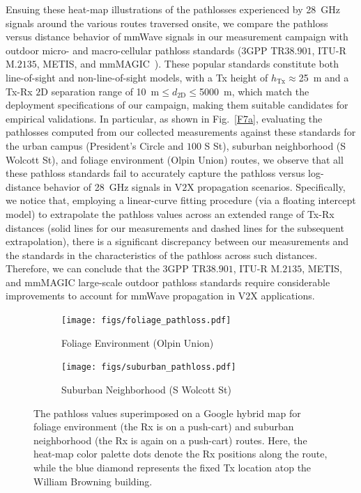 \documentclass[12pt, draftcls, onecolumn]{IEEEtran}
\begin{document}
{Ensuing these heat-map illustrations of the pathlosses experienced by \SI{28}{\giga\hertz} signals around the various routes traversed onsite, we compare the pathloss versus distance behavior of mmWave signals in our measurement campaign with outdoor micro- and macro-cellular pathloss standards ($3$GPP TR$38.901$, ITU-R M$.2135$, METIS, and mmMAGIC~\cite{MacCartneyModelsOverview}). These popular standards constitute both line-of-sight and non-line-of-sight models, with a Tx height of $h_{\text{Tx}}{\approx}$\SI{25}{\meter} and a Tx-Rx $2$D separation range of \SI{10}{\meter}${\leq}d_{2\text{D}}{\leq}$\SI{5000}{\meter}, which match the deployment specifications of our campaign, making them suitable candidates for empirical validations. In particular, as shown in Fig.~\ref{F7a}, evaluating the pathlosses computed from our collected measurements against these standards for the urban campus (President's Circle and $100$ S St), suburban neighborhood (S Wolcott St), and foliage environment (Olpin Union) routes, we observe that all these pathloss standards fail to accurately capture the pathloss versus log-distance behavior of \SI{28}{\giga\hertz} signals in V$2$X propagation scenarios. Specifically, we notice that, employing a linear-curve fitting procedure (via a floating intercept model) to extrapolate the pathloss values across an extended range of Tx-Rx distances (solid lines for our measurements and dashed lines for the subsequent extrapolation), there is a significant discrepancy between our measurements and the standards in the characteristics of the pathloss across such distances. Therefore, we can conclude that the $3$GPP TR$38.901$, ITU-R M$.2135$, METIS, and mmMAGIC large-scale outdoor pathloss standards require considerable improvements to account for mmWave propagation in V$2$X applications.
\begin{figure} [t]
    \centering
    \begin{subfigure}{0.5565\linewidth}
        \centering
        \texttt{[image: figs/foliage\_pathloss.pdf]}
        \caption{Foliage Environment (Olpin Union)}
        \label{F6a}
    \end{subfigure}
    \begin{subfigure}{0.4335\linewidth}
        \centering
        \texttt{[image: figs/suburban\_pathloss.pdf]}
        \caption{Suburban Neighborhood (S Wolcott St)}
        \label{F6b}
    \end{subfigure}
    \vspace{-8mm}
    \caption{The pathloss values superimposed on a Google hybrid map for foliage environment (the Rx is on a push-cart) and suburban neighborhood (the Rx is again on a push-cart) routes. Here, the heat-map color palette dots denote the Rx positions along the route, while the blue diamond represents the fixed Tx location atop the William Browning building.}
    \label{F6}
\end{figure}

}
\end{document}
